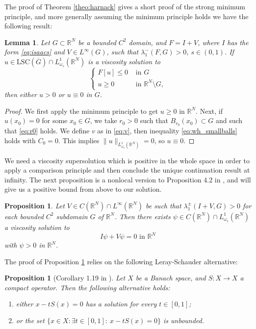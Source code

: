 \documentclass[a4paper,11pt]{article}
\newcommand{\R}{\mathbb{R}}
\newcommand{\I}{I}
\newcommand{\lsc}{\text{LSC}}
\newcommand{\Lomega}{L_{\omega_s}^1(\R^N)}
\newtheorem{lemma}[theorem]{Lemma}
\newtheorem{proposition}[theorem]{Proposition}
\begin{document}
The proof of Theorem \ref{theo:harnack} gives a short proof of the strong minimum principle, and more generally assuming the minimum principle holds we have the following result:
\begin{lemma}
\label{lemma:smp}
Let $G \subset \R^N$ be a bounded $C^2$ domain, and $F=\I+V$, where $\I$ has the form \eqref{eq:isaacs} and $V\in L^{\infty}(G)$, such that $\lambda_1^- (F, G)>0$, $s\in (0, 1)$. If $u\in \lsc(\overline{G}) \cap L_{\omega_s}^1(\R^N)$ is a viscosity solution to
\[\begin{cases}
F[u] \leq 0 & \text{ in }G\\
u\geq 0 & \text{ in }\R^N \setminus G, 
\end{cases}\]
then either $u>0$  or $u\equiv 0$ in $G$.
\end{lemma}

\begin{proof}
We first apply the minimum principle to get $u\ge 0$ in $\R^N$. Next, if $u(x_0)= 0$ for some $x_0 \in G$, we take $r_0> 0$ such that $B_{r_0}(x_0) \subset G$ and such that \eqref{eq:r0} holds. We define $v$ as in \eqref{eq:v}, then inequality \eqref{eq:wh_smallballs} holds with $C_0 = 0$. This implies $\|u\|_{\Lomega} = 0$, so $u\equiv 0$.
\end{proof}

We need a viscosity supersolution which is positive in the whole space in order to apply a comparison principle and then conclude the unique continuation result at infinity. The next proposition is a nonlocal version to Proposition 4.2 in \cite{sirakov_vazquez_2021}, and will give us a positive bound from above to our solution.

\begin{proposition}
\label{prop:positivesol}
Let $V \in C(\R^N) \cap L^{\infty}(\R^N)$ be such that $\lambda_1^\pm ( I + V, G) >0$ for each bounded $C^2$ subdomain $G$ of $\R^N$. Then there exists $\psi \in C(\R^N) \cap \Lomega$ a viscosity solution to
\[I \psi + V\psi = 0 \text{ in } \R^N \]
with $\psi>0$ in $\R^N$.
\end{proposition}

The proof of Proposition \ref{prop:positivesol} relies on the following Leray-Schauder alternative:
\begin{proposition}[Corollary 1.19 in \cite{bandle_solutions_2004}]\label{LS}
	Let $X$ be a Banach space, and $S:X\rightarrow X$ a compact operator. Then the following alternative holds:
	\begin{enumerate}
		\item either $x-tS(x) = 0$ has a solution for every $t\in [0,1]$;
		\item or the set $\{x\in X: \exists t \in [0,1]:~x-tS(x) = 0\}$ is unbounded.
	\end{enumerate}
\end{proposition}
\end{document}
